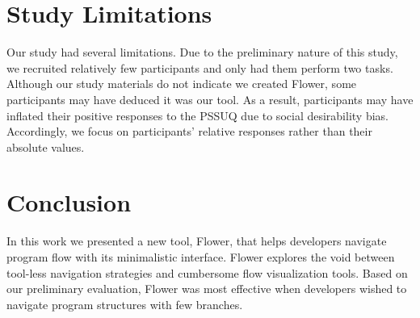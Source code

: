 \documentclass[conference]{IEEEtran}
\begin{document}
	




\section{Study Limitations}
Our study had several limitations.
Due to the preliminary nature of this study, we recruited relatively few participants and only had them perform two tasks.
Although our study materials do not indicate we created Flower, some participants may have deduced it was our tool.
As a result, participants may have inflated their positive responses to the PSSUQ due to social desirability bias.
Accordingly, we focus on participants' relative responses rather than their absolute values.

\section{Conclusion}

In this work we presented a new tool, Flower, that helps developers navigate program flow with its minimalistic interface. 
Flower explores the void between tool-less navigation strategies and cumbersome flow visualization tools.
Based on our preliminary evaluation, Flower  was most effective when developers wished to navigate program structures with few branches.

\end{document}
